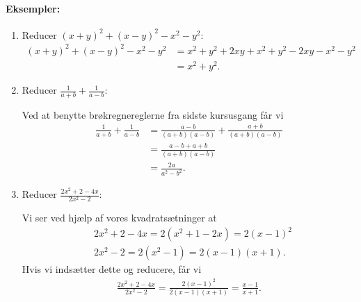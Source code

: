 \paragraph{Eksempler:}
\begin{enumerate}
\item Reducer $(x+y)^2+(x-y)^2-x^2-y^2$:
\begin{align*}
(x+y)^2+(x-y)^2-x^2-y^2 &= x^2+y^2+2xy + x^2+y^2-2xy - x^2-y^2 \\
&=x^2+y^2.
\end{align*}
\item Reducer $\frac{1}{a+b}+\frac{1}{a-b}$:

Ved at benytte brøkregnereglerne fra sidste kursusgang får vi
\begin{align*}
\frac{1}{a+b}+\frac{1}{a-b} &= \frac{a-b}{(a+b)(a-b)} + \frac{a+b}{(a+b)(a-b)} \\
&= \frac{a-b+a+b}{(a+b)(a-b)} \\
&=\frac{2a}{a^2-b^2}.
\end{align*}
\item Reducer $\frac{2x^2+2-4x}{2x^2-2}$:

Vi ser ved hjælp af vores kvadratsætninger at
\begin{align*}
&2x^2+2-4x = 2(x^2+1-2x) = 2 (x-1)^2 \\
&2x^2-2 = 2(x^2-1) = 2(x-1)(x+1).
\end{align*}
Hvis vi indsætter dette og reducere, får vi
\begin{align*}
\frac{2x^2+2-4x}{2x^2-2} = \frac{2 (x-1)^2}{2(x-1)(x+1)} = \frac{x-1}{x+1}.
\end{align*}
\end{enumerate}

